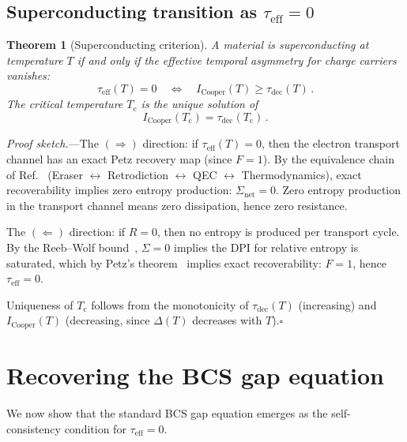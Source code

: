 \documentclass[prb,twocolumn,superscriptaddress,longbibliography,floatfix]{revtex4-2}
\newtheorem{theorem}{Theorem}
\newcommand{\tauasym}{\tau}
\newcommand{\taueff}{\tauasym_{\mathrm{eff}}}
\newcommand{\taudec}{\tauasym_{\mathrm{dec}}}
\newcommand{\Icoop}{I_{\mathrm{Cooper}}}
\newcommand{\Tc}{T_{\mathrm{c}}}
\begin{document}
\subsection{Superconducting transition as $\taueff = 0$}

\begin{theorem}[Superconducting criterion]
\label{thm:sc}
A material is superconducting at temperature $T$ if and only if
the effective temporal asymmetry for charge carriers vanishes:
\begin{equation}\label{eq:sc_criterion}
  \taueff(T) = 0 \quad\Leftrightarrow\quad
  \Icoop(T) \geq \taudec(T)\,.
\end{equation}
The critical temperature $\Tc$ is the unique solution of
\begin{equation}\label{eq:Tc_equation}
  \Icoop(\Tc) = \taudec(\Tc)\,.
\end{equation}
\end{theorem}

\emph{Proof sketch.}---The $(\Rightarrow)$ direction:
if $\taueff(T) = 0$, then the electron transport channel
has an exact Petz recovery map (since $F = 1$).  By the
equivalence chain of Ref.~\cite{Huang2026}
(Eraser $\leftrightarrow$ Retrodiction $\leftrightarrow$
QEC $\leftrightarrow$ Thermodynamics), exact recoverability
implies zero entropy production: $\Sigma_{\mathrm{net}} = 0$.
Zero entropy production in the transport channel means zero
dissipation, hence zero resistance.

The $(\Leftarrow)$ direction: if $R = 0$, then no entropy
is produced per transport cycle.  By the Reeb--Wolf
bound~\cite{ReebWolf2014}, $\Sigma = 0$ implies the DPI
for relative entropy is saturated, which by
Petz's theorem~\cite{Petz1988} implies exact recoverability:
$F = 1$, hence $\taueff = 0$.

Uniqueness of $\Tc$ follows from the monotonicity of
$\taudec(T)$ (increasing) and $\Icoop(T)$ (decreasing, since
$\Delta(T)$ decreases with $T$).\hfill$\square$

\section{Recovering the BCS gap equation}
\label{sec:gap}

We now show that the standard BCS gap equation emerges as the
self-consistency condition for $\taueff = 0$.
\end{document}

